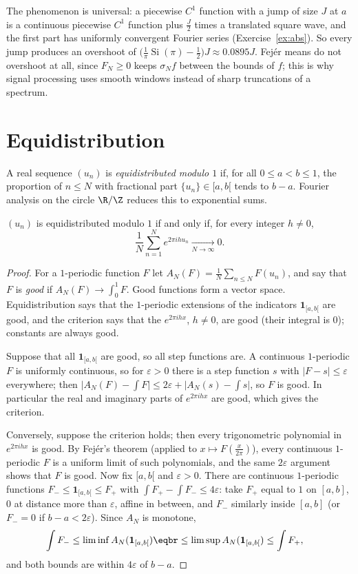 The phenomenon is universal: a piecewise $C^1$ function with a jump of size $J$ at $a$ is a continuous piecewise $C^1$
function plus $\frac J2$ times a translated square wave, and the first part has uniformly convergent Fourier series
(Exercise~\ref{ex:abs}). So every jump produces an overshoot of $\bigl(\frac1\pi\operatorname{Si}(\pi)-\frac12\bigr)J\approx0.0895J$. Fej\'er means do not overshoot at
all, since $F_N\ge0$ keeps $\sigma_Nf$ between the bounds of $f$; this is why signal processing uses smooth windows instead of
sharp truncations of a spectrum.

\section{Equidistribution}

A real sequence $(u_n)$ is \emph{equidistributed modulo $1$} if, for all $0\le a<b\le1$, the proportion of $n\le N$ with fractional part
$\{u_n\}\in[a,b[$ tends to $b-a$. Fourier analysis on the circle $\R/\Z$ reduces this to exponential sums.

\begin{theorem}\label{thm:weyl}
$(u_n)$ is equidistributed modulo $1$ if and only if, for every integer $h\ne0$,
\[
\frac1N\sum_{n=1}^Ne^{2\pi ihu_n}\xrightarrow[N\to\infty]{}0.
\]
\end{theorem}
\begin{proof}
For a $1$-periodic function $F$ let $A_N(F)=\frac1N\sum_{n\le N}F(u_n)$, and say that $F$ is \emph{good} if $A_N(F)\to\int_0^1F$. Good functions form a
vector space. Equidistribution says that the $1$-periodic extensions of the indicators $\mathbf 1_{[a,b[}$ are good, and the
criterion says that the $e^{2\pi ihx}$, $h\ne0$, are good (their integral is $0$); constants are always good.

Suppose that all $\mathbf 1_{[a,b[}$ are good, so all step functions are. A continuous $1$-periodic $F$ is uniformly continuous, so for
$\varepsilon>0$ there is a step function $s$ with $|F-s|\le\varepsilon$ everywhere; then $\bigl|A_N(F)-\int F\bigr|\le2\varepsilon+\bigl|A_N(s)-\int s\bigr|$, so $F$ is good.
In particular the real and imaginary parts of $e^{2\pi ihx}$ are good, which gives the criterion.

Conversely, suppose the criterion holds; then every trigonometric polynomial in $e^{2\pi ihx}$ is good. By Fej\'er's theorem
(applied to $x\mapsto F(\frac x{2\pi})$), every continuous $1$-periodic $F$ is a uniform limit of such polynomials, and the same $2\varepsilon$
argument shows that $F$ is good. Now fix $[a,b[$ and $\varepsilon>0$. There are continuous $1$-periodic functions $F_-\le\mathbf 1_{[a,b[}\le F_+$ with
$\int F_+-\int F_-\le4\varepsilon$: take $F_+$ equal to $1$ on $[a,b]$, $0$ at distance more than $\varepsilon$, affine in between, and $F_-$ similarly
inside $[a,b]$ (or $F_-=0$ if $b-a<2\varepsilon$). Since $A_N$ is monotone,
\[
\begin{aligned}\int F_-&\le\liminf A_N(\mathbf 1_{[a,b[})\eqbr\le\limsup A_N(\mathbf 1_{[a,b[})\le\int F_+,\end{aligned}
\]
and both bounds are within $4\varepsilon$ of $b-a$.
\end{proof}

